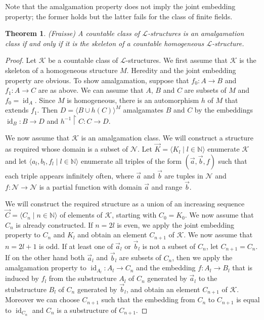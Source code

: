 \documentclass[10pt]{amsart}
\renewcommand{\L}{\mathcal{L}}
\newcommand{\id}{\operatorname{id}}
\newcommand{\NNN}{\mathbb{N}}
\newcommand{\NN}{\mathcal{N}}
\newcommand{\K}{\mathcal{K}}
\newtheorem{theorem}{Theorem}[subsection]
\theoremstyle{definition}
\theoremstyle{remark}
\begin{document}
Note that the amalgamation property does not imply the  joint embedding property; the former holds but the latter fails for the class of finite fields. 

\begin{theorem} (Fraisse) \label{existence of Fraisse limits} 
A countable class of $\L$-structures is an amalgamation class if and only if it is the skeleton of a countable homogeneous $\L$-structure. 
\end{theorem} 
\begin{proof} 
Let $\K$ be a countable class of $\L$-structures. We first assume that $\K$ is the skeleton of a homogeneous structure $M$. Heredity and the joint embedding property are obvious. To show amalgamation, suppose that $f_0\colon A\rightarrow B$ and $f_1\colon A\rightarrow C$ are as above. We can assume that $A$, $B$ and $C$ are subsets of $M$ and $f_0=\id_A$. Since $M$ is homogeneous, there is an automorphism $h$ of $M$ that extends $f_1$. Then $D=\langle B\cup h(C)\rangle^M$ amalgamates $B$ and $C$ by the embeddings $\id_B\colon B\rightarrow D$ and $h^{-1}{\upharpoonright}C\colon C\rightarrow D$. 

We now assume that $\K$ is an amalgamation class. We will construct a structure as required whose domain is a subset of $\NN$. Let $\vec{K}=\langle K_l\mid l\in\NNN\rangle$ enumerate $\K$ and let 
$\langle a_l,b_l,f_l\mid l\in\NNN\rangle$ enumerate all triples of the form $(\vec{a},\vec{b},f)$ such that each triple appears infinitely often, where $\vec{a}$ and $\vec{b}$ are tuples in $\NN$ and $f\colon \NN\rightarrow \NN$ is a partial function with domain $\vec{a}$ and range $\vec{b}$. 

We will construct the required structure as a union of an increasing sequence $\vec{C}=\langle C_n\mid n\in\NNN\rangle$ of elements of $\K$, starting with $C_0=K_0$. We now assume that $C_n$ is already constructed. If $n=2l$ is even, we apply the joint embedding property to $C_n$ and $K_l$ and obtain an element $C_{n+1}$ of $\K$. We now assume that $n=2l+1$ is odd. If at least one of $\vec{a}_l$ or $\vec{b}_l$ is not a subset of $C_n$, let $C_{n+1}=C_n$. If on the other hand both $\vec{a}_l$ and $\vec{b}_l$ are subsets of $C_n$, then we apply the amalgamation property to $\id_{A_l}\colon A_l\rightarrow C_n$ and the embedding $f\colon A_l\rightarrow B_l$ that is induced by $f_l$ from the substructure $A_l$ of $C_n$ generated by $\vec{a}_l$ to the stubstructure $B_l$ of $C_n$ generated by $\vec{b}_l$, and obtain an element $C_{n+1}$ of $\K$. Moreover we can choose $C_{n+1}$ such that the embedding from $C_n$ to $C_{n+1}$ is equal to $\id_{C_n}$ and $C_n$ is a substructure of $C_{n+1}$. 


\end{proof}
\end{document}
